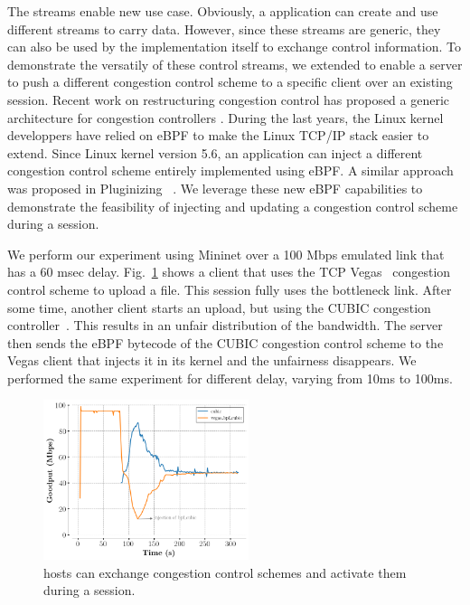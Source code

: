 The \tcpls streams enable new use case. Obviously, a \tcpls application can
create and use different streams to carry data. However, since these streams
are generic, they can also be used by the \tcpls implementation itself to
exchange control information. To demonstrate the versatily of these control
streams, we extended \tcpls to enable a server to push a different congestion
control scheme to a specific client over an existing \tcpls session. Recent
work on restructuring congestion control has proposed a generic architecture
for congestion controllers \cite{narayan2018restructuring}.
During the last years, the Linux kernel developpers have relied on eBPF
to make the Linux TCP/IP stack \cite{brakmo2017tcp,tran2020beyond} easier
to extend. Since Linux kernel version 5.6, an application can inject
a different congestion control scheme entirely implemented using eBPF. A similar
approach was proposed in Pluginizing \quic~\cite{de2019pluginizing}.  We
leverage these new eBPF capabilities to demonstrate the feasibility of injecting
and updating a congestion control scheme during a \tcpls session.

We perform our experiment using Mininet  over a 100 Mbps emulated link that has a 60 msec delay.
Fig.~\ref{fig:vegasCubic} shows a client that uses the TCP
Vegas~\cite{10.1145/190314.190317} congestion control scheme to upload a file.
This \tcpls session fully uses the bottleneck link. After some time, another
client starts an upload, but using the CUBIC congestion
controller~\cite{rfc8312}. This results in an unfair distribution of the
bandwidth. The server then sends the eBPF bytecode of the CUBIC congestion
control scheme to the \tcp Vegas client that injects it in its kernel and the
unfairness disappears.  We performed the same experiment for different delay,
varying from 10ms to 100ms.

\begin{figure}[!t]
  \begin{center}
    \includegraphics[width=6cm]{pretty_plotify/plots/vegas_cubic.png}
  \end{center}
\vspace{-0.5cm}
  \caption{\tcpls hosts can exchange congestion control schemes and activate them during a \tcpls session.}
  \label{fig:vegasCubic}
\end{figure}
